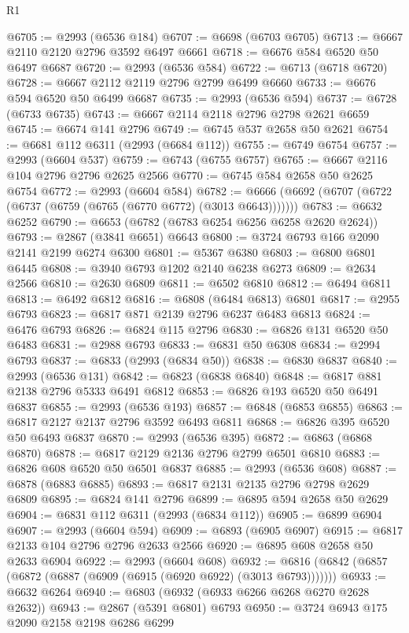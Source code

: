 \begin{lexlean}{R1}
\begin{coremodule}
@6705 := @2993 (@6536 @184)
@6707 := @6698 (@6703 @6705)
@6713 := @6667 @2110 @2120 @2796 @3592 @6497 @6661
@6718 := @6676 @584 @6520 @50 @6497 @6687
@6720 := @2993 (@6536 @584)
@6722 := @6713 (@6718 @6720)
@6728 := @6667 @2112 @2119 @2796 @2799 @6499 @6660
@6733 := @6676 @594 @6520 @50 @6499 @6687
@6735 := @2993 (@6536 @594)
@6737 := @6728 (@6733 @6735)
@6743 := @6667 @2114 @2118 @2796 @2798 @2621 @6659
@6745 := @6674 @141 @2796
@6749 := @6745 @537 @2658 @50 @2621
@6754 := @6681 @112 @6311 (@2993 (@6684 @112))
@6755 := @6749 @6754
@6757 := @2993 (@6604 @537)
@6759 := @6743 (@6755 @6757)
@6765 := @6667 @2116 @104 @2796 @2796 @2625 @2566
@6770 := @6745 @584 @2658 @50 @2625 @6754
@6772 := @2993 (@6604 @584)
@6782 := @6666 (@6692 (@6707 (@6722 (@6737 (@6759 (@6765 (@6770 @6772) (@3013 @6643)))))))
@6783 := @6632 @6252
@6790 := @6653 (@6782 (@6783 @6254 @6256 @6258 @2620 @2624))
@6793 := @2867 (@3841 @6651) @6643
@6800 := @3724 @6793 @166 @2090 @2141 @2199 @6274 @6300
@6801 := @5367 @6380
@6803 := @6800 @6801 @6445
@6808 := @3940 @6793 @1202 @2140 @6238 @6273
@6809 := @2634 @2566
@6810 := @2630 @6809
@6811 := @6502 @6810
@6812 := @6494 @6811
@6813 := @6492 @6812
@6816 := @6808 (@6484 @6813) @6801
@6817 := @2955 @6793
@6823 := @6817 @871 @2139 @2796 @6237 @6483 @6813
@6824 := @6476 @6793
@6826 := @6824 @115 @2796
@6830 := @6826 @131 @6520 @50 @6483
@6831 := @2988 @6793
@6833 := @6831 @50 @6308
@6834 := @2994 @6793
@6837 := @6833 (@2993 (@6834 @50))
@6838 := @6830 @6837
@6840 := @2993 (@6536 @131)
@6842 := @6823 (@6838 @6840)
@6848 := @6817 @881 @2138 @2796 @5333 @6491 @6812
@6853 := @6826 @193 @6520 @50 @6491 @6837
@6855 := @2993 (@6536 @193)
@6857 := @6848 (@6853 @6855)
@6863 := @6817 @2127 @2137 @2796 @3592 @6493 @6811
@6868 := @6826 @395 @6520 @50 @6493 @6837
@6870 := @2993 (@6536 @395)
@6872 := @6863 (@6868 @6870)
@6878 := @6817 @2129 @2136 @2796 @2799 @6501 @6810
@6883 := @6826 @608 @6520 @50 @6501 @6837
@6885 := @2993 (@6536 @608)
@6887 := @6878 (@6883 @6885)
@6893 := @6817 @2131 @2135 @2796 @2798 @2629 @6809
@6895 := @6824 @141 @2796
@6899 := @6895 @594 @2658 @50 @2629
@6904 := @6831 @112 @6311 (@2993 (@6834 @112))
@6905 := @6899 @6904
@6907 := @2993 (@6604 @594)
@6909 := @6893 (@6905 @6907)
@6915 := @6817 @2133 @104 @2796 @2796 @2633 @2566
@6920 := @6895 @608 @2658 @50 @2633 @6904
@6922 := @2993 (@6604 @608)
@6932 := @6816 (@6842 (@6857 (@6872 (@6887 (@6909 (@6915 (@6920 @6922) (@3013 @6793)))))))
@6933 := @6632 @6264
@6940 := @6803 (@6932 (@6933 @6266 @6268 @6270 @2628 @2632))
@6943 := @2867 (@5391 @6801) @6793
@6950 := @3724 @6943 @175 @2090 @2158 @2198 @6286 @6299

\end{coremodule}
\end{lexlean}
